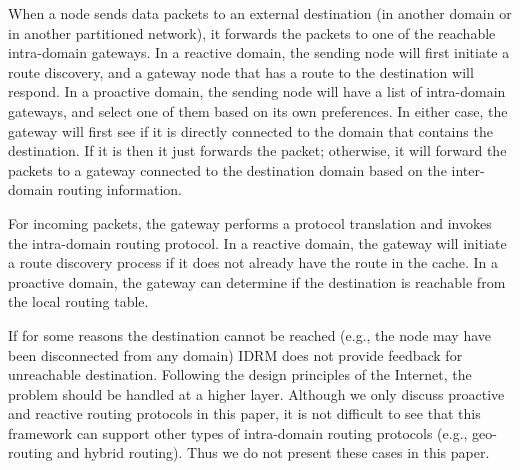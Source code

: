 



When a node sends data packets to an external destination (in another domain or in another partitioned network), it forwards the packets to one of the reachable intra-domain gateways. In a reactive domain, the sending node will first initiate a route discovery, and a gateway node that has a route to the destination will respond.  In a proactive domain, the sending node will have a list of intra-domain gateways, and select one of them based on its own preferences. 
In either case, the gateway will first see if it is directly connected to the domain that contains the destination.  If it is then it just forwards the packet; otherwise, it will forward the packets to a gateway connected to the destination domain based on the inter-domain routing information.

For incoming packets, the gateway performs a protocol translation and invokes the intra-domain routing protocol.  In a reactive domain, the gateway will initiate a route discovery process if it does not already have the route in the cache. In a proactive domain, the gateway can determine if the destination is reachable from the local routing table. 

If for some reasons the destination cannot be reached (e.g., the node may have been disconnected from any domain) IDRM does not provide feedback for unreachable destination. Following the design principles of the Internet, the problem should be handled at a higher layer.  Although we only discuss proactive and reactive routing protocols in this paper, it is not difficult to see that this framework can support other types of intra-domain routing protocols (e.g., geo-routing and hybrid routing). Thus we do not present these cases in this paper.

